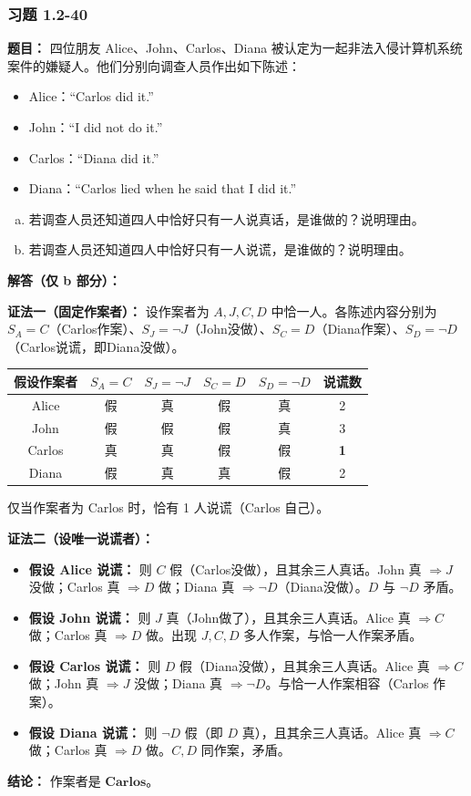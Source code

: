 \documentclass[11pt,UTF8]{article}
\begin{document}
\subsubsection*{习题 1.2-40}
\textbf{题目：} 四位朋友 Alice、John、Carlos、Diana 被认定为一起非法入侵计算机系统案件的嫌疑人。他们分别向调查人员作出如下陈述：
\begin{itemize}
    \item Alice：``Carlos did it.''
    \item John：``I did not do it.''
    \item Carlos：``Diana did it.''
    \item Diana：``Carlos lied when he said that I did it.''
\end{itemize}
\begin{enumerate}[a)]
    \item 若调查人员还知道四人中恰好只有一人说真话，是谁做的？说明理由。
    \item 若调查人员还知道四人中恰好只有一人说谎，是谁做的？说明理由。
\end{enumerate}

\textbf{解答（仅 b 部分）：}

\textbf{证法一（固定作案者）：} 设作案者为 $A, J, C, D$ 中恰一人。各陈述内容分别为 $S_A=C$（Carlos作案）、$S_J=\neg J$（John没做）、$S_C=D$（Diana作案）、$S_D=\neg D$（Carlos说谎，即Diana没做）。
\begin{center}
\begin{tabular}{c|cccc|c}
\hline
假设作案者 & $S_A=C$ & $S_J=\neg J$ & $S_C=D$ & $S_D=\neg D$ & 说谎数 \\
\hline
Alice   & 假 & 真 & 假 & 真 & 2 \\
John    & 假 & 假 & 假 & 真 & 3 \\
Carlos  & 真 & 真 & 假 & 假 & \textbf{1} \\
Diana   & 假 & 真 & 真 & 假 & 2 \\
\hline
\end{tabular}
\end{center}
仅当作案者为 Carlos 时，恰有 1 人说谎（Carlos 自己）。

\textbf{证法二（设唯一说谎者）：}
\begin{itemize}
    \item \textbf{假设 Alice 说谎：} 则 $C$ 假（Carlos没做），且其余三人真话。John 真 $\Rightarrow J$ 没做；Carlos 真 $\Rightarrow D$ 做；Diana 真 $\Rightarrow \neg D$（Diana没做）。$D$ 与 $\neg D$ 矛盾。
    \item \textbf{假设 John 说谎：} 则 $J$ 真（John做了），且其余三人真话。Alice 真 $\Rightarrow C$ 做；Carlos 真 $\Rightarrow D$ 做。出现 $J, C, D$ 多人作案，与恰一人作案矛盾。
    \item \textbf{假设 Carlos 说谎：} 则 $D$ 假（Diana没做），且其余三人真话。Alice 真 $\Rightarrow C$ 做；John 真 $\Rightarrow J$ 没做；Diana 真 $\Rightarrow \neg D$。与恰一人作案相容（Carlos 作案）。
    \item \textbf{假设 Diana 说谎：} 则 $\neg D$ 假（即 $D$ 真），且其余三人真话。Alice 真 $\Rightarrow C$ 做；Carlos 真 $\Rightarrow D$ 做。$C, D$ 同作案，矛盾。
\end{itemize}
\textbf{结论：} 作案者是 $\mathbf{Carlos}$。
\end{document}
